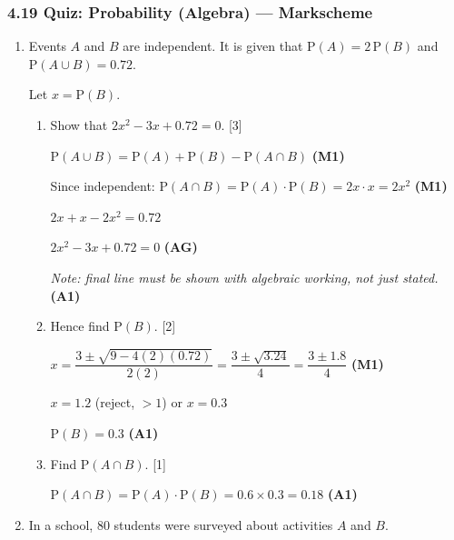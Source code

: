 \documentclass[12pt, twoside]{article}
\begin{document}
\subsubsection*{4.19 Quiz: Probability (Algebra) --- Markscheme}

\begin{enumerate}[itemsep=0.15cm]

\item Events $A$ and $B$ are independent. It is given that
      $\mathrm{P}(A) = 2\,\mathrm{P}(B)$ and $\mathrm{P}(A \cup B) = 0.72$.

      Let $x = \mathrm{P}(B)$.

\begin{enumerate}[itemsep=0.3cm]
  \item Show that $2x^{2} - 3x + 0.72 = 0$. \hfill [3]

  $\mathrm{P}(A \cup B) = \mathrm{P}(A) + \mathrm{P}(B) - \mathrm{P}(A \cap B)$ \hfill \textbf{(M1)}

  Since independent: $\mathrm{P}(A \cap B) = \mathrm{P}(A) \cdot \mathrm{P}(B) = 2x \cdot x = 2x^{2}$ \hfill \textbf{(M1)}

  $2x + x - 2x^{2} = 0.72$

  $2x^{2} - 3x + 0.72 = 0$ \hfill \textbf{(AG)}

  \emph{Note: final line must be shown with algebraic working, not just stated.} \hfill \textbf{(A1)}

  \item Hence find $\mathrm{P}(B)$. \hfill [2]

  $x = \dfrac{3 \pm \sqrt{9 - 4(2)(0.72)}}{2(2)}
     = \dfrac{3 \pm \sqrt{3.24}}{4}
     = \dfrac{3 \pm 1.8}{4}$ \hfill \textbf{(M1)}

  $x = 1.2$ (reject, $> 1$) or $x = 0.3$

  $\mathrm{P}(B) = 0.3$ \hfill \textbf{(A1)}

  \item Find $\mathrm{P}(A \cap B)$. \hfill [1]

  $\mathrm{P}(A \cap B) = \mathrm{P}(A) \cdot \mathrm{P}(B) = 0.6 \times 0.3 = 0.18$ \hfill \textbf{(A1)}
\end{enumerate}

\newpage

\item In a school, 80 students were surveyed about activities $A$ and $B$.


\end{enumerate}
\end{document}
